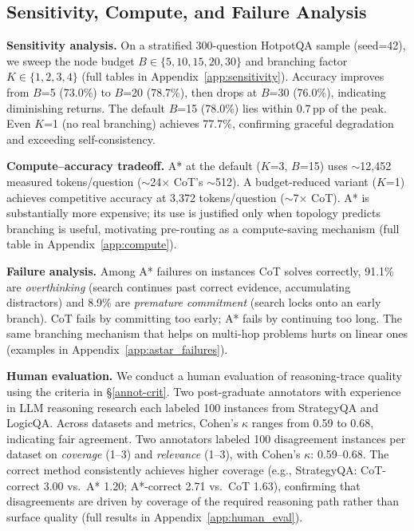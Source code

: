 \documentclass[10pt]{article}
\begin{document}
\subsection{Sensitivity, Compute, and Failure Analysis}
\label{sec:sensitivity}

\textbf{Sensitivity analysis.}
On a stratified 300-question HotpotQA sample (seed=42), we sweep the node budget $B \in \{5,10,15,20,30\}$ and branching factor $K \in \{1,2,3,4\}$ (full tables in Appendix~\ref{app:sensitivity}). Accuracy improves from $B$=5 (73.0\%) to $B$=20 (78.7\%), then drops at $B$=30 (76.0\%), indicating diminishing returns. The default $B$=15 (78.0\%) lies within 0.7\,pp of the peak. Even $K$=1 (no real branching) achieves 77.7\%, confirming graceful degradation and exceeding self-consistency.

\textbf{Compute--accuracy tradeoff.}
A* at the default ($K$=3, $B$=15) uses $\sim$12,452 measured tokens/question ($\sim$24$\times$ CoT's $\sim$512). A budget-reduced variant ($K$=1) achieves competitive accuracy at 3,372 tokens/question ($\sim$7$\times$ CoT). A* is substantially more expensive; its use is justified only when topology predicts branching is useful, motivating pre-routing as a compute-saving mechanism (full table in Appendix~\ref{app:compute}).

\textbf{Failure analysis.}
Among A* failures on instances CoT solves correctly, 91.1\% are \emph{overthinking} (search continues past correct evidence, accumulating distractors) and 8.9\% are \emph{premature commitment} (search locks onto an early branch). CoT fails by committing too early; A* fails by continuing too long. The same branching mechanism that helps on multi-hop problems hurts on linear ones (examples in Appendix~\ref{app:astar_failures}).

\textbf{Human evaluation.} We conduct a human evaluation of reasoning-trace quality using the criteria in \S\ref{annot-crit}. Two post-graduate annotators with experience in LLM reasoning research each labeled 100 instances from StrategyQA and LogicQA. Across datasets and metrics, Cohen's \(\kappa\) ranges from 0.59 to 0.68, indicating fair agreement. Two annotators labeled 100 disagreement instances per dataset on \emph{coverage} (1--3) and \emph{relevance} (1--3), with Cohen's $\kappa$: 0.59--0.68. The correct method consistently achieves higher coverage (e.g., StrategyQA: CoT-correct 3.00 vs.\ A* 1.20; A*-correct 2.71 vs.\ CoT 1.63), confirming that disagreements are driven by coverage of the required reasoning path rather than surface quality (full results in Appendix~\ref{app:human_eval}).
\end{document}
